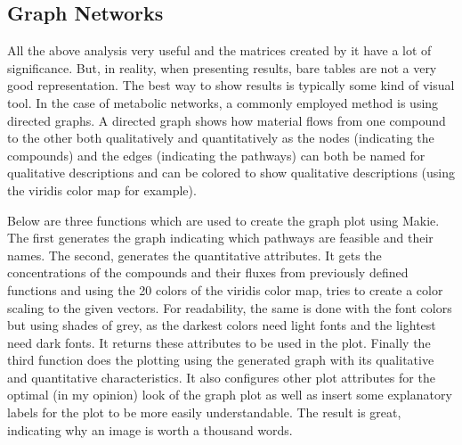 \documentclass[11pt]{article}
\begin{document}
\subsection{Graph Networks}
\label{sec:orgbc9aeeb}
All the above analysis very useful and the matrices created by it have a lot of significance. But, in reality, when presenting results, bare tables are not a very good representation. The best way to show results is typically some kind of visual tool. In the case of metabolic networks, a commonly employed method is using directed graphs. A directed graph shows how material flows from one compound to the other both qualitatively and quantitatively as the nodes (indicating the compounds) and the edges (indicating the pathways) can both be named for qualitative descriptions and can be colored to show qualitative descriptions (using the viridis color map for example).

Below are three functions which are used to create the graph plot using Makie. The first generates the graph indicating which pathways are feasible and their names. The second, generates the quantitative attributes. It gets the concentrations of the compounds and their fluxes from previously defined functions and using the 20 colors of the viridis color map, tries to create a color scaling to the given vectors. For readability, the same is done with the font colors but using shades of grey, as the darkest colors need light fonts and the lightest need dark fonts. It returns these attributes to be used in the plot. Finally the third function does the plotting using the generated graph with its qualitative and quantitative characteristics. It also configures other plot attributes for the optimal (in my opinion) look of the graph plot as well as insert some explanatory labels for the plot to be more easily understandable. The result is great, indicating why an image is worth a thousand words.
\end{document}
